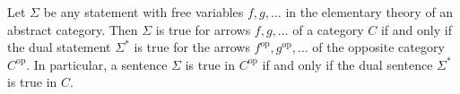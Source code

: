 Let $\Sigma$ be any statement with free variables $f, g, \ldots$ in the elementary theory of an abstract category. Then $\Sigma$ is true for arrows $f, g, \ldots$ of a category $C$ if and only if the dual statement $\Sigma^*$ is true for the arrows $f^{\text{op}}, g^{\text{op}}, \ldots$ of the opposite category $C^{\text{op}}$. In particular, a sentence $\Sigma$ is true in $C^{\text{op}}$ if and only if the dual sentence $\Sigma^*$ is true in $C$.
